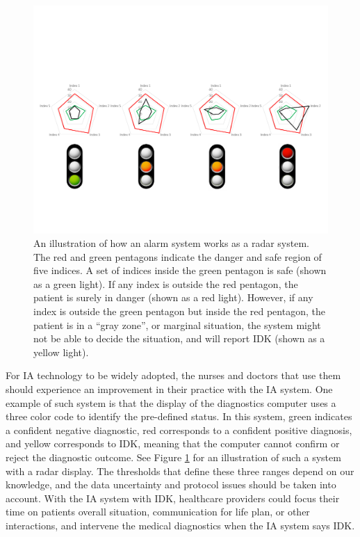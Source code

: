 \documentclass[11pt]{pnas-new}
\begin{document}
\begin{figure}[h]
\begin{center}
\includegraphics[trim=0 100 0 200,clip,width=7in]{figures/RedYellowGreen2.pdf}
\caption{An illustration of how an alarm system works as a radar system. The red and green pentagons indicate the danger and safe region of five indices. A set of indices inside the green pentagon is safe (shown as a green light). If any index is outside the red pentagon, the patient is surely in danger (shown as a red light). However, if any index is outside the green pentagon but inside the red pentagon, the patient is in a ``gray zone'', or marginal situation, the system might not be able to decide the situation, and will report IDK (shown as a yellow light).\label{Figure IDK light}}
\end{center}
\end{figure}

  For IA technology to be widely adopted, the nurses and doctors that
  use them should experience an improvement in their practice {\color{blue}with the IA system. One example of such system is}
  that the display of the diagnostics computer uses a three color code
  to identify {\color{blue}the pre-defined status. In this system,} green indicates a confident
  negative diagnostic, red corresponds to a confident positive
  diagnosis, and yellow corresponds to IDK, meaning that the
  computer cannot confirm or reject the diagnostic outcome. {\color{blue}See Figure \ref{Figure IDK light} for an illustration of such a system with a radar display. The thresholds that define these three ranges depend on our knowledge, and the data uncertainty and protocol issues should be taken into account. With the IA system with IDK, healthcare providers could focus their time on patients overall situation, communication for life plan, or other interactions, and intervene the medical diagnostics when the IA system says IDK.}
\end{document}
